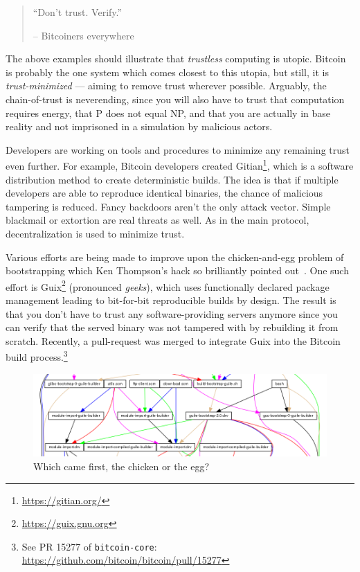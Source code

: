\begin{quotation}\begin{samepage}
\enquote{Don't trust. Verify.}
\begin{flushright} -- Bitcoiners everywhere
\end{flushright}\end{samepage}\end{quotation}

The above examples should illustrate that \textit{trustless} computing is
utopic. Bitcoin is probably the one system which comes closest to this
utopia, but still, it is \textit{trust-minimized} --- aiming to remove trust
wherever possible. Arguably, the chain-of-trust is neverending, since
you will also have to trust that computation requires energy, that P
does not equal NP, and that you are actually in base reality and not
imprisoned in a simulation by malicious actors.

Developers are working on tools and procedures to minimize any remaining trust
even further. For example, Bitcoin developers created
Gitian\footnote{\url{https://gitian.org/}}, which is a software distribution
method to create deterministic builds. The idea is that if multiple developers
are able to reproduce identical binaries, the chance of malicious tampering is
reduced. Fancy backdoors aren't the only attack vector. Simple blackmail or
extortion are real threats as well. As in the main protocol, decentralization is
used to minimize trust.

Various efforts are being made to improve upon the chicken-and-egg problem of
bootstrapping which Ken Thompson's hack so brilliantly pointed
out~\cite{web:bootstrapping}. One such effort is
Guix\footnote{\url{https://guix.gnu.org}} (pronounced \textit{geeks}), which
uses functionally declared package management leading to bit-for-bit
reproducible builds by design. The result is that you don't have to trust any
software-providing servers anymore since you can verify that the served binary
was not tampered with by rebuilding it from scratch. Recently, a
pull-request was merged to integrate Guix into the Bitcoin build process.\footnote{See PR 15277 of \texttt{bitcoin-core}: \\ \url{https://github.com/bitcoin/bitcoin/pull/15277}}

\begin{figure}
  \includegraphics{assets/images/guix-bootstrap-dependencies.png}
  \caption{Which came first, the chicken or the egg?}
  \label{fig:guix-bootstrap-dependencies}
\end{figure}

